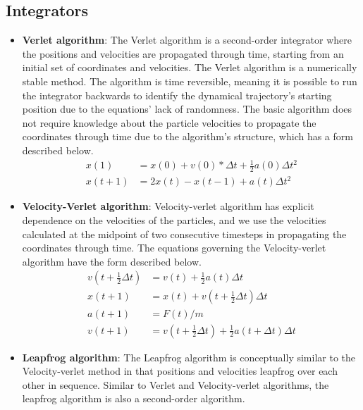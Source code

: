 \subsection[Integrators]{Integrators}
    \begin{itemize}
        \item \textbf{Verlet algorithm}\supercite{grubmuller_generalized_1991, gronbech-jensen_simple_2013}: The Verlet algorithm is a second-order integrator where the positions and velocities are propagated through time, starting from an initial set of coordinates and velocities. The Verlet algorithm is a numerically stable method. The algorithm is time reversible, meaning it is possible to run the integrator backwards to identify the dynamical trajectory's starting position due to the equations' lack of randomness. The basic algorithm does not require knowledge about the particle velocities to propagate the coordinates through time due to the algorithm's structure, which has a form described below.
        \begin{align*}
            x(1) &= x(0) + v(0)*\Delta t + \frac{1}{2}a(0)\Delta{t^2} \\
            x(t+1) &= 2x(t) - x(t-1) + a(t)\Delta{t^2}
        \end{align*}
        \item \textbf{Velocity-Verlet algorithm}\supercite{paterlini_constant_1998,marry_trotter_2007}: Velocity-verlet algorithm has explicit dependence on the velocities of the particles, and we use the velocities calculated at the midpoint of two consecutive timesteps in propagating the coordinates through time. The equations governing the Velocity-verlet algorithm have the form described below.
        \begin{align*}
            v(t + \frac{1}{2}\Delta{t}) &= v(t) + \frac{1}{2}a(t)\Delta{t} \\
            x(t+1) &= x(t) + v(t+ \frac{1}{2}\Delta{t})\Delta{t} \\
            a(t+1) &= F(t)/m \\
            v(t+1) &= v(t+\frac{1}{2}\Delta{t}) + \frac{1}{2}a(t+\Delta{t})\Delta{t}
        \end{align*}
        \item \textbf{Leapfrog algorithm}\supercite{toxvaerd_algorithms_1991,van_gunsteren_leap-frog_1988}: The Leapfrog algorithm is conceptually similar to the Velocity-verlet method in that positions and velocities leapfrog over each other in sequence. Similar to Verlet and Velocity-verlet algorithms, the leapfrog algorithm is also a second-order algorithm. 
    \end{itemize}


